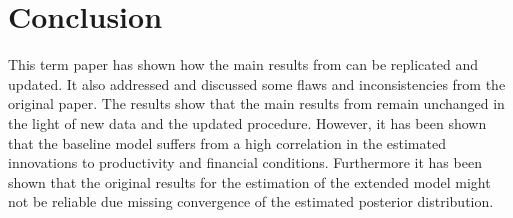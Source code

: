
\section{Conclusion}
\label{sec:conclusion}

This term paper has shown how the main results from
\textcite{jerman_macroeconomic_2012} can be replicated and updated. It also
addressed and discussed some flaws and inconsistencies from the original
paper. The results show that the main results from
\textcite{jerman_macroeconomic_2012} remain unchanged in the light of new data
and the updated procedure. However, it has been shown that the baseline model
suffers from a high correlation in the estimated innovations to productivity
and financial conditions. Furthermore it has been shown that the original
results for the estimation of the extended model might not be reliable due
missing convergence of the estimated posterior distribution.
